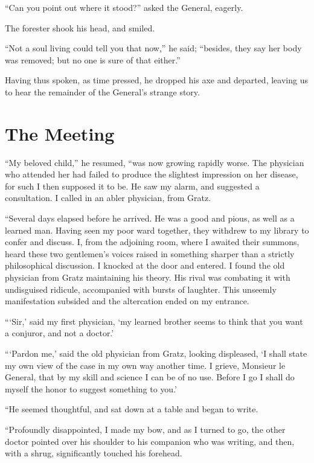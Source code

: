 \documentclass[11pt,twoside,makeidx,hidelinks,]{memoir}
\begin{document}
``Can you point out where it stood?'' asked the General, eagerly.

The forester shook his head, and smiled.

``Not a soul living could tell you that now,'' he said; ``besides, they say
her body was removed; but no one is sure of that either.''

Having thus spoken, as time pressed, he dropped his axe and departed,
leaving us to hear the remainder of the General's strange story.

\pbreak{}

\chapter{The Meeting}\hypertarget{the-meeting}{}\label{the-meeting}

``My beloved child,'' he resumed, ``was now growing rapidly worse. The
physician who attended her had failed to produce the slightest
impression on her disease, for such I then supposed it to be. He saw my
alarm, and suggested a consultation. I called in an abler physician,
from Gratz.

``Several days elapsed before he arrived. He was a good and pious, as well
as a learned man. Having seen my poor ward together, they withdrew to my
library to confer and discuss. I, from the adjoining room, where I
awaited their summons, heard these two gentlemen's voices raised in
something sharper than a strictly philosophical discussion. I knocked at
the door and entered. I found the old physician from Gratz maintaining
his theory. His rival was combating it with undisguised ridicule,
accompanied with bursts of laughter. This unseemly manifestation
subsided and the altercation ended on my entrance.

``{}`Sir,' said my first physician, `my learned brother seems to think that
you want a conjuror, and not a doctor.'

``{}`Pardon me,' said the old physician from Gratz, looking displeased, `I
shall state my own view of the case in my own way another time. I
grieve, Monsieur le General, that by my skill and science I can be of no
use. Before I go I shall do myself the honor to suggest something to
you.'

``He seemed thoughtful, and sat down at a table and began to write.

``Profoundly disappointed, I made my bow, and as I turned to go, the other
doctor pointed over his shoulder to his companion who was writing, and
then, with a shrug, significantly touched his forehead.
\end{document}
